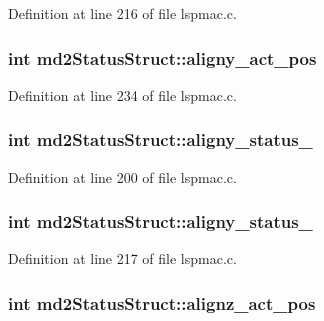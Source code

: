 Definition at line 216 of file lspmac.c.\hypertarget{structmd2StatusStruct_a0d40a01d2aa93c443526e826440f77fc}{
\subsubsection[{aligny\_\-act\_\-pos}]{\setlength{\rightskip}{0pt plus 5cm}int {\bf md2StatusStruct::aligny\_\-act\_\-pos}}}
\label{structmd2StatusStruct_a0d40a01d2aa93c443526e826440f77fc}


Definition at line 234 of file lspmac.c.\hypertarget{structmd2StatusStruct_a2f2a11fe2fc7a446323def2be465185a}{
\subsubsection[{aligny\_\-status\_\-1}]{\setlength{\rightskip}{0pt plus 5cm}int {\bf md2StatusStruct::aligny\_\-status\_}}}
\label{structmd2StatusStruct_a2f2a11fe2fc7a446323def2be465185a}


Definition at line 200 of file lspmac.c.\hypertarget{structmd2StatusStruct_a1f98d8b9831e32d77129f9b0f1d7d255}{
\subsubsection[{aligny\_\-status\_\-2}]{\setlength{\rightskip}{0pt plus 5cm}int {\bf md2StatusStruct::aligny\_\-status\_}}}
\label{structmd2StatusStruct_a1f98d8b9831e32d77129f9b0f1d7d255}


Definition at line 217 of file lspmac.c.\hypertarget{structmd2StatusStruct_a480f892fe91b05b2980fb00064807e2b}{
\subsubsection[{alignz\_\-act\_\-pos}]{\setlength{\rightskip}{0pt plus 5cm}int {\bf md2StatusStruct::alignz\_\-act\_\-pos}}}
\label{structmd2StatusStruct_a480f892fe91b05b2980fb00064807e2b}


